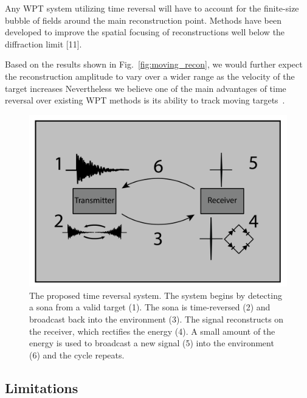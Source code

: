 Any WPT system utilizing time reversal will have to account for the 
finite-size bubble of fields around  the  main  reconstruction  point.
Methods  have  been developed  to  improve  the  spatial  focusing  of  reconstructions
well below the diffraction limit [11]. 

Based on the results shown in Fig.~\ref{fig:moving_recon}, we would further
expect the reconstruction amplitude to vary over a wider range as the velocity
of the target increases
%
Nevertheless we believe one of the main advantages of time reversal over
existing WPT methods is its ability to track moving
targets~\cite{fink,nltr-wave-chaotic}.


\begin{figure}[t]
\includegraphics[width=\columnwidth]{figs/WPTSys.png}
\caption{The proposed time reversal system. The system begins by detecting a sona from a valid target (1). The sona is time-reversed (2) and broadcast back into the environment (3). The signal reconstructs on the receiver, which rectifies the energy (4).  A small amount of the energy is used to broadcast a new signal (5) into the environment (6) and the cycle repeats.}
\label{fig:SysImage}
\end{figure}

\subsection{Limitations}
\label{sec:limitations}


